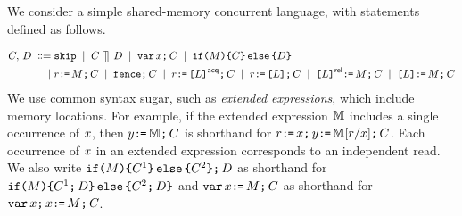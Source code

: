 We consider a simple shared-memory concurrent language, with statements
defined as follows.

\begin{comment}
\footnote{We only consider executions where register state is empty in
  forked threads.  Given item~\ref{pre-acquire} of
  Definition~\ref{def:prefix}, a sufficient condition is that parallel
  composition is always preceded by an acquire fence, as in programs of the
  form:
  \begin{displaymath}
    \VAR\vec{\aLoc}\SEMI
    \vec{\aLoc}\GETS\vec{0}\SEMI
    \vec{\bLoc}\GETS\vec{0}\SEMI
    \FENCE\SEMI
    (\aCmd^1 \PAR \cdots \PAR \aCmd^n)
  \end{displaymath}
  where $\aCmd^1$, \ldots, $\aCmd^n$ do not include $\PAR$.  To avoid clutter
  in drawings, we often drop the explicit fence.}.
\end{comment}

\begin{align*}
C,\,D
\;\mathrel{\mathord{\vcentcolon}\mkern-1mu\mathord{\vcentcolon}\mathord{{=}}}\;& \texttt{skip}
\;\mathrel{|}\; C \,\mathbin{\rrceil}\, D
\;\mathrel{|}\; \texttt{var}\,x\texttt{;}\, C
\;\mathrel{|}\; \texttt{if}\allowbreak\texttt{(}M\texttt{)} \allowbreak\texttt{\{} C \texttt{\}}\,\allowbreak\texttt{else}\allowbreak\,\texttt{\{} D \texttt{\}}
\\
\;\mathrel{|}\;& r\texttt{:}\mkern-1mu\texttt{=}\,M\texttt{;}\, C
\;\mathrel{|}\; \texttt{fence}\texttt{;}\, C
\;\mathrel{|}\; r\texttt{:}\mkern-1mu\texttt{=}\,\texttt{[}L\texttt{]}^{\mathsf{acq}}\texttt{;}\, C 
\;\mathrel{|}\; r\texttt{:}\mkern-1mu\texttt{=}\,\texttt{[}L\texttt{]}\texttt{;}\, C
\;\mathrel{|}\; \texttt{[}L\texttt{]}^{\mathsf{rel}}\texttt{:}\mkern-1mu\texttt{=}\,M\texttt{;}\, C
\;\mathrel{|}\; \texttt{[}L\texttt{]}\texttt{:}\mkern-1mu\texttt{=}\,M\texttt{;}\, C
\end{align*}
We use common syntax sugar, such as \emph{extended expressions}, which include
memory locations.  For example, if the extended expression $\mathbb{M}$ includes
a single occurrence of $x$, then $y\texttt{:}\mkern-1mu\texttt{=}\,\mathbb{M}\texttt{;}\, C$ is
shorthand for $r\texttt{:}\mkern-1mu\texttt{=}\,x\texttt{;}\,y\texttt{:}\mkern-1mu\texttt{=}\,\mathbb{M}[r/x]\texttt{;}\, C$.
Each occurrence of $x$ in an extended expression corresponds to an
independent read.  We also write
$\texttt{if}\allowbreak\texttt{(}M\texttt{)} \allowbreak\texttt{\{} C^1 \texttt{\}}\,\allowbreak\texttt{else}\allowbreak\,\texttt{\{} C^2 \texttt{\}} \texttt{;}\, D$ as shorthand for
$\texttt{if}\allowbreak\texttt{(}M\texttt{)} \allowbreak\texttt{\{} C^1 \texttt{;}\, D\texttt{\}}\,\allowbreak\texttt{else}\allowbreak\,\texttt{\{} C^2 \texttt{;}\, D\texttt{\}}$ and
$\texttt{var}\,x\texttt{:}\mkern-1mu\texttt{=}\,M\texttt{;}\, C$ as shorthand for
$\texttt{var}\,x\texttt{;}\,x\texttt{:}\mkern-1mu\texttt{=}\,M\texttt{;}\, C$.

